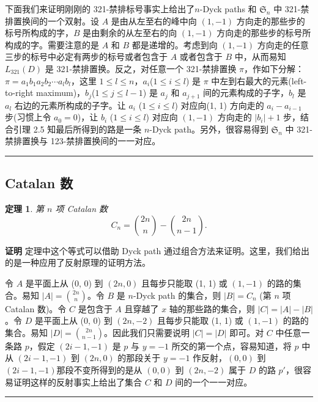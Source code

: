 \documentclass[a4paper,11pt,twoside]{book}
\newtheorem{thm}{定理}[section]
\def\qed{\nopagebreak\hfill{\rule{4pt}{7pt}}\medbreak}
\begin{document}
下面我们来证明刚刚的 321-禁排标号事实上给出了$n$-Dyck paths 和
$\mathfrak{S}_n$ 中 321-禁排置换间的一个双射。设 $A$
是由从左至右的峰中向 $(1, -1)$ 方向走的那些步的标号所构成的字，$B$
是由剩余的从左至右的向 $(1, -1)$
方向走的那些步的标号所构成的字。需要注意的是 $A$ 和 $B$
都是递增的。考虑到向 $(1, -1)$
方向走的任意三步的标号中必定有两步的标号或者包含于 $A$ 或者包含于
$B$ 中，从而易知 $L_{321}(D)$ 是 321-禁排置换。反之，对任意一个
321-禁排置换 $\pi$，作如下分解：$\pi=a_1b_1a_2b_2\cdots
a_lb_l$，这里 $1\le l\le n$，$a_i$($1\le i\le l$) 是 $\pi$
中左到右最大的元素(left-to-right maximum)，$b_j$($1\le j\le l-1$) 是
$a_j$ 和 $a_{j+1}$ 间的元素构成的子字，$b_l$ 是 $a_l$
右边的元素所构成的子字。让 $a_i$ ($1\le i\le l$) 对应向(1, 1)
方向走的 $a_i-a_{i-1}$ 步(习惯上令 $a_0=0$)，让 $b_i$ ($1\le i\le
l$) 对应向 $(1, -1)$ 方向走的 $|b_i|+1$ 步，结合引理 2.5
知最后所得到的路是一条 $n$-Dyck path。另外，很容易得到
$\mathfrak{S}_n$ 中 321-禁排置换与 123-禁排置换间的一一对应。\qed

\subsection{Catalan 数}

\begin{thm}第 $n$ 项 Catalan 数
$$C_n={2n\choose n}-{2n\choose n-1}.$$
\end{thm}
{\bf{证明}} 定理中这个等式可以借助 Dyck path
通过组合方法来证明。这里，我们给出的是一种应用了反射原理的证明方法。

令 $A$ 是平面上从 (0, 0) 到 $(2n, 0)$ 且每步只能取 (1, 1) 或 $(1,
-1)$ 的路的集合。易知 $|A|={2n\choose n}$。令 $B$ 是 $n$-Dyck path
的集合，则 $|B|=C_n$ (第 $n$ 项 Catalan 数)。令 $C$ 是包含于 $A$
且穿越了 $x$ 轴的那些路的集合，则 $|C|=|A|-|B|$。令 $D$ 是平面上从
(0, 0) 到 $(2n, -2)$ 且每步只能取 (1, 1) 或 $(1, -1)$
的路的集合。易知 $|D|={2n\choose n-1}$。因此我们只需要说明 $|C|=|D|$
即可。对 $C$ 中任意一条路 $p$，假定 $(2i-1, -1)$ 是 $p$ 与 $y=-1$
所交的第一个点，容易知道，将 $p$ 中从 $(2i-1, -1)$ 到 $(2n, 0)$
的那段关于 $y=-1$ 作反射，$(0, 0)$ 到 $(2i-1,
-1)$那段不变所得到的是从 $(0, 0)$ 到 $(2n, -2)$ 属于 $D$ 的路
$p'$，很容易证明这样的反射事实上给出了集合 $C$ 和 $D$
间的一个一一对应。\qed
\end{document}
